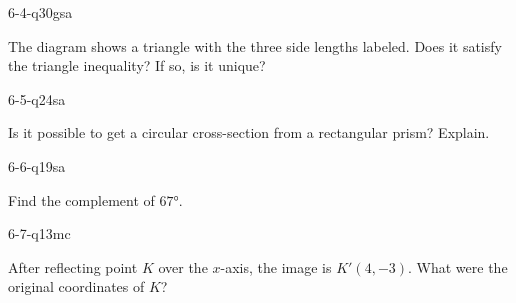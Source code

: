 \begin{practiceQuestion}{6-4-q30}{gsa}
\begin{questionText}
The diagram shows a triangle with the three side lengths labeled. Does it satisfy the triangle inequality? If so, is it unique?

\begin{center}
\end{center}
\end{questionText}
\end{practiceQuestion}

\begin{practiceQuestion}{6-5-q24}{sa}
\begin{questionText}
Is it possible to get a circular cross-section from a rectangular prism? Explain.
\end{questionText}
\end{practiceQuestion}

\begin{practiceQuestion}{6-6-q19}{sa}
\begin{questionText}
Find the complement of $67°$.
\end{questionText}
\end{practiceQuestion}

\begin{practiceQuestion}{6-7-q13}{mc}
\begin{questionText}
After reflecting point $K$ over the $x$-axis, the image is $K'(4, -3)$. What were the original coordinates of $K$?
\end{questionText}
\end{practiceQuestion}

